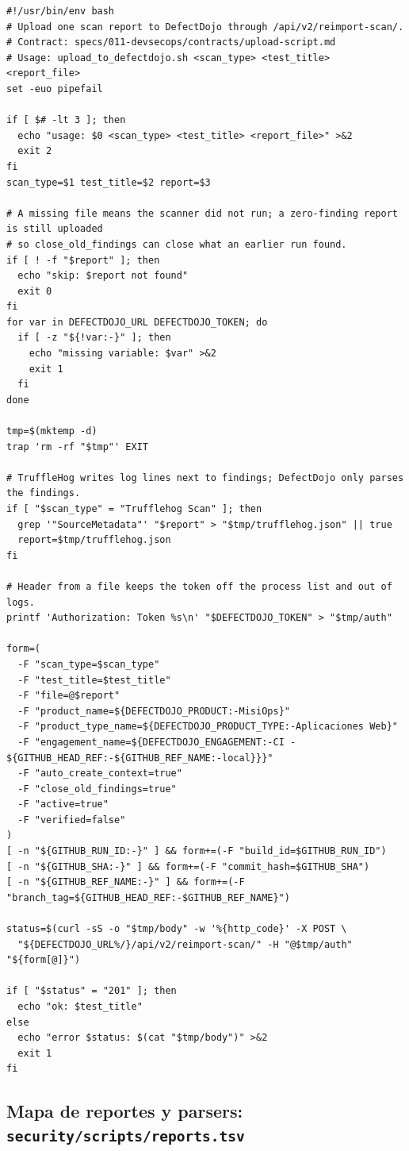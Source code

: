 \begin{lstlisting}
#!/usr/bin/env bash
# Upload one scan report to DefectDojo through /api/v2/reimport-scan/.
# Contract: specs/011-devsecops/contracts/upload-script.md
# Usage: upload_to_defectdojo.sh <scan_type> <test_title> <report_file>
set -euo pipefail

if [ $# -lt 3 ]; then
  echo "usage: $0 <scan_type> <test_title> <report_file>" >&2
  exit 2
fi
scan_type=$1 test_title=$2 report=$3

# A missing file means the scanner did not run; a zero-finding report is still uploaded
# so close_old_findings can close what an earlier run found.
if [ ! -f "$report" ]; then
  echo "skip: $report not found"
  exit 0
fi
for var in DEFECTDOJO_URL DEFECTDOJO_TOKEN; do
  if [ -z "${!var:-}" ]; then
    echo "missing variable: $var" >&2
    exit 1
  fi
done

tmp=$(mktemp -d)
trap 'rm -rf "$tmp"' EXIT

# TruffleHog writes log lines next to findings; DefectDojo only parses the findings.
if [ "$scan_type" = "Trufflehog Scan" ]; then
  grep '"SourceMetadata"' "$report" > "$tmp/trufflehog.json" || true
  report=$tmp/trufflehog.json
fi

# Header from a file keeps the token off the process list and out of logs.
printf 'Authorization: Token %s\n' "$DEFECTDOJO_TOKEN" > "$tmp/auth"

form=(
  -F "scan_type=$scan_type"
  -F "test_title=$test_title"
  -F "file=@$report"
  -F "product_name=${DEFECTDOJO_PRODUCT:-MisiOps}"
  -F "product_type_name=${DEFECTDOJO_PRODUCT_TYPE:-Aplicaciones Web}"
  -F "engagement_name=${DEFECTDOJO_ENGAGEMENT:-CI - ${GITHUB_HEAD_REF:-${GITHUB_REF_NAME:-local}}}"
  -F "auto_create_context=true"
  -F "close_old_findings=true"
  -F "active=true"
  -F "verified=false"
)
[ -n "${GITHUB_RUN_ID:-}" ] && form+=(-F "build_id=$GITHUB_RUN_ID")
[ -n "${GITHUB_SHA:-}" ] && form+=(-F "commit_hash=$GITHUB_SHA")
[ -n "${GITHUB_REF_NAME:-}" ] && form+=(-F "branch_tag=${GITHUB_HEAD_REF:-$GITHUB_REF_NAME}")

status=$(curl -sS -o "$tmp/body" -w '%{http_code}' -X POST \
  "${DEFECTDOJO_URL%/}/api/v2/reimport-scan/" -H "@$tmp/auth" "${form[@]}")

if [ "$status" = "201" ]; then
  echo "ok: $test_title"
else
  echo "error $status: $(cat "$tmp/body")" >&2
  exit 1
fi
\end{lstlisting}

\subsection{Mapa de reportes y parsers: \texttt{security/scripts/reports.tsv}}
\label{anx:reports}

